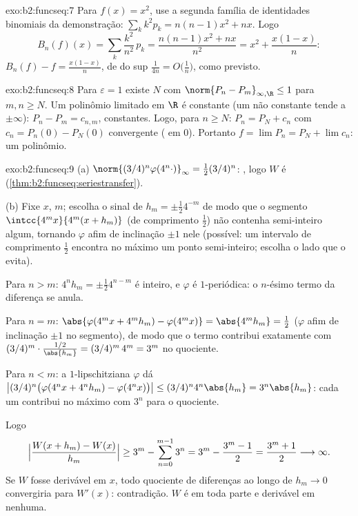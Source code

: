 \begin{solution}{exo:b2:funcseq:7}
Para $f(x) = x^2$, use a segunda família de identidades binomiais da
demonstração: $\sum_k k^2 p_k = n(n-1)x^2 + nx$. Logo
\[
B_n(f)(x) = \sum_k \frac{k^2}{n^2}\,p_k
= \frac{n(n-1)x^2 + nx}{n^2}
= x^2 + \frac{x(1 - x)}{n} :
\]
$B_n(f) - f = \frac{x(1-x)}{n}$, de  do sup $\frac{1}{4n} =
O\bigl(\frac1n\bigr)$, como previsto.
\end{solution}

\begin{solution}{exo:b2:funcseq:8}
Para $\varepsilon = 1$ existe $N$ com $\norm{P_n - P_m}_{\infty,
\R} \leq 1$ para $m, n \geq N$. Um polinômio limitado em $\R$ é
constante (um não constante tende a $\pm\infty$): $P_n - P_m =
c_{n,m}$, constantes. Logo, para $n \geq N$: $P_n = P_N + c_n$ com
$c_n = P_n(0) - P_N(0)$ convergente ( em $0$).
Portanto $f = \lim P_n = P_N + \lim c_n$: um polinômio.
\end{solution}

\begin{solution}{exo:b2:funcseq:9}
(a) $\norm{(3/4)^n\varphi(4^n\cdot)}_\infty = \frac12
(3/4)^n$: , logo $W$ é 
(\cref{thm:b2:funcseq:seriestransfer}).

(b) Fixe $x$, $m$; escolha o sinal de $h_m = \pm\frac12 4^{-m}$ de modo
que o segmento $\intcc{4^mx}{4^m(x + h_m)}$ (de comprimento $\frac12$)
não contenha semi-inteiro algum, tornando $\varphi$ afim de inclinação $\pm1$
nele (possível: um intervalo de comprimento $\frac12$ encontra no máximo um
ponto semi-inteiro; escolha o lado que o evita).

Para $n > m$: $4^n h_m = \pm\frac12 4^{n-m}$ é inteiro, e
$\varphi$ é $1$-periódica: o $n$-ésimo termo da diferença
se anula.

Para $n = m$: $\abs{\varphi(4^m x + 4^m h_m) - \varphi(4^m x)} =
\abs{4^m h_m} = \frac12$ ($\varphi$ afim de inclinação $\pm 1$ no
segmento), de modo que o termo contribui exatamente com $(3/4)^m \cdot
\frac{1/2}{\abs{h_m}} = (3/4)^m\,4^m = 3^m$ no quociente.

Para $n < m$: a $1$-lipschitziana $\varphi$ dá
$\bigl|(3/4)^n\bigl(\varphi(4^nx + 4^nh_m) -
\varphi(4^nx)\bigr)\bigr| \leq (3/4)^n 4^n\abs{h_m} =
3^n\abs{h_m}$: cada um contribui no máximo com $3^n$ para o quociente.

Logo
\[
\Bigl|\frac{W(x + h_m) - W(x)}{h_m}\Bigr|
\geq 3^m - \sum_{n=0}^{m-1} 3^n
= 3^m - \frac{3^m - 1}{2} = \frac{3^m + 1}{2}
\longrightarrow \infty .
\]
Se $W$ fosse derivável em $x$, todo quociente de diferenças ao longo de
$h_m \to 0$ convergiria para $W'(x)$: contradição. $W$ é
 em toda parte e derivável em nenhuma.
\end{solution}

